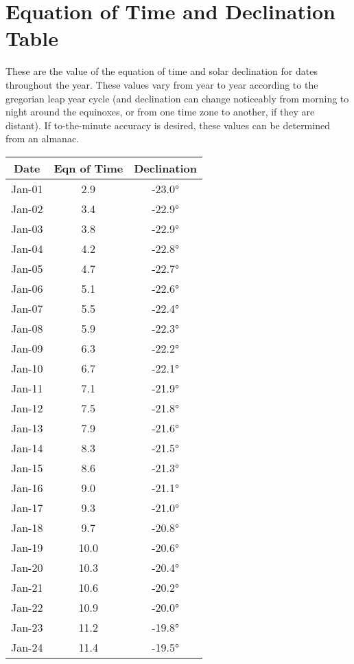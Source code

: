 \section{Equation of Time and Declination Table}

These are the value of the equation of time and solar declination for dates throughout the year. These values vary from year to year according to the gregorian leap year cycle (and declination can change noticeably from morning to night around the equinoxes, or from one time zone to another, if they are distant). If to-the-minute accuracy is desired, these values can be determined from an almanac.

\begin{footnotesize}
	\begin{minipage}{0.33\textwidth}
\begin{tabular}[t]{c | c | c }
	Date&Eqn of Time&Declination\\\hline
Jan-01 & 2.9 & -23.0°\\\hline
Jan-02 & 3.4 & -22.9°\\\hline
Jan-03 & 3.8 & -22.9°\\\hline
Jan-04 & 4.2 & -22.8°\\\hline
Jan-05 & 4.7 & -22.7°\\\hline
Jan-06 & 5.1 & -22.6°\\\hline
Jan-07 & 5.5 & -22.4°\\\hline
Jan-08 & 5.9 & -22.3°\\\hline
Jan-09 & 6.3 & -22.2°\\\hline
Jan-10 & 6.7 & -22.1°\\\hline
Jan-11 & 7.1 & -21.9°\\\hline
Jan-12 & 7.5 & -21.8°\\\hline
Jan-13 & 7.9 & -21.6°\\\hline
Jan-14 & 8.3 & -21.5°\\\hline
Jan-15 & 8.6 & -21.3°\\\hline
Jan-16 & 9.0 & -21.1°\\\hline
Jan-17 & 9.3 & -21.0°\\\hline
Jan-18 & 9.7 & -20.8°\\\hline
Jan-19 & 10.0 & -20.6°\\\hline
Jan-20 & 10.3 & -20.4°\\\hline
Jan-21 & 10.6 & -20.2°\\\hline
Jan-22 & 10.9 & -20.0°\\\hline
Jan-23 & 11.2 & -19.8°\\\hline
Jan-24 & 11.4 & -19.5°\\\hline

\end{tabular}
\end{minipage}
\end{footnotesize}
